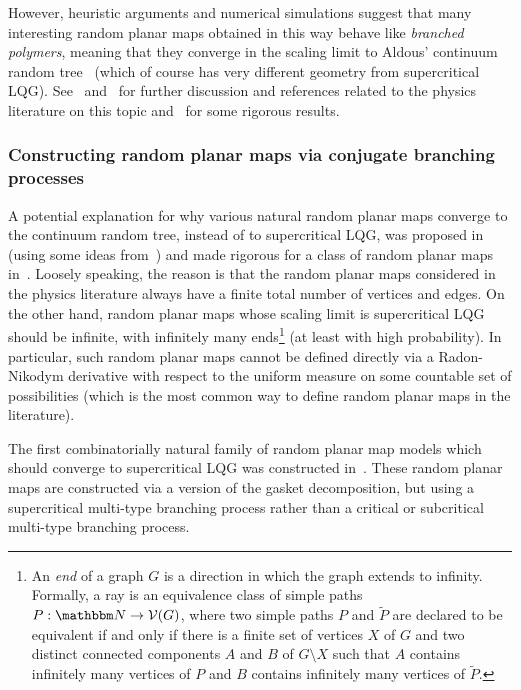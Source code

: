 \documentclass[11pt]{article}
\theoremstyle{plain}
\theoremstyle{definition}
\numberwithin{equation}{section}
\newcommand{\BB}{\mathbbm}
\newcommand{\wt}{\widetilde}
\newcommand{\mcl}{\mathcal}
\begin{document}
However, heuristic arguments and numerical simulations suggest that many interesting random planar maps obtained in this way behave like \textit{branched polymers}, meaning that they converge in the scaling limit to Aldous' continuum random tree~\cite{aldous-crt1} (which of course has very different geometry from supercritical LQG). 
See~\cite[Section 2.2]{ghpr-central-charge} and~\cite[Section 1.1]{bgs-supercritical-crt} for further discussion and references related to the physics literature on this topic and~\cite{feng-fk-triviality, bgs-supercritical-crt} for some rigorous results. 
  
 
\subsubsection*{Constructing random planar maps via conjugate branching processes}

A potential explanation for why various natural random planar maps converge to the continuum random tree, instead of to supercritical LQG, was proposed in~\cite[Section 2.2]{ghpr-central-charge} (using some ideas from~\cite{apps-central-charge}) and made rigorous for a class of random planar maps in~\cite{bgs-supercritical-crt}. Loosely speaking, the reason is that the random planar maps considered in the physics literature always have a finite total number of vertices and edges. On the other hand, random planar maps whose scaling limit is supercritical LQG should be infinite, with infinitely many ends\footnote{
An \emph{end} of a graph $G$ is a direction in which the graph extends to infinity. Formally, a ray is an equivalence class of simple paths $P : \BB N \to \mcl V(G)$, where two simple paths $P$ and $\wt P$ are declared to be equivalent if and only if there is a finite set of vertices $X$ of $G$ and two distinct connected components $A$ and $B$ of $G\setminus X$ such that $A$ contains infinitely many vertices of $P$ and $B$ contains infinitely many vertices of $\wt P$.
}
(at least with high probability).
In particular, such random planar maps cannot be defined directly via a Radon-Nikodym derivative with respect to the uniform measure on some countable set of possibilities (which is the most common way to define random planar maps in the literature). 

The first combinatorially natural family of random planar map models which should converge to supercritical LQG was constructed in~\cite[Section 3.2]{ag-supercritical-cle4}. These random planar maps are constructed via a version of the gasket decomposition, but using a supercritical multi-type branching process rather than a critical or subcritical multi-type branching process. 
 
\end{document}
